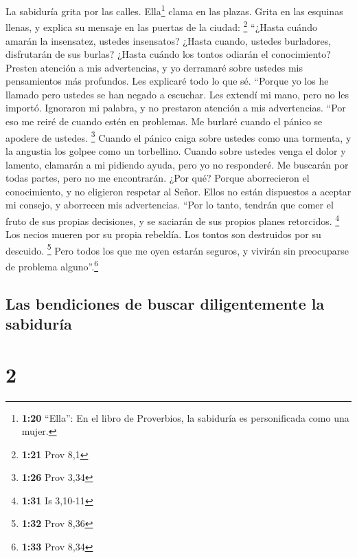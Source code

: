  La sabiduría grita por las calles. Ella\footnote{\textbf{1:20}
  ``Ella'': En el libro de Proverbios, la sabiduría es personificada
  como una mujer.} clama en las plazas.  Grita en las
esquinas llenas, y explica su mensaje en las puertas de la ciudad:
\footnote{\textbf{1:21} Prov 8,1}  ``¿Hasta cuándo amarán
la insensatez, ustedes insensatos? ¿Hasta cuando, ustedes burladores,
disfrutarán de sus burlas? ¿Hasta cuándo los tontos odiarán el
conocimiento?  Presten atención a mis advertencias, y yo
derramaré sobre ustedes mis pensamientos más profundos. Les explicaré
todo lo que sé.  ``Porque yo los he llamado pero ustedes
se han negado a escuchar. Les extendí mi mano, pero no les importó.
 Ignoraron mi palabra, y no prestaron atención a mis
advertencias.  ``Por eso me reiré de cuando estén en
problemas. Me burlaré cuando el pánico se apodere de ustedes.
\footnote{\textbf{1:26} Prov 3,34}  Cuando el pánico
caiga sobre ustedes como una tormenta, y la angustia los golpee como un
torbellino. Cuando sobre ustedes venga el dolor y lamento,
 clamarán a mi pidiendo ayuda, pero yo no responderé. Me
buscarán por todas partes, pero no me encontrarán.  ¿Por
qué? Porque aborrecieron el conocimiento, y no eligieron respetar al
Señor.  Ellos no están dispuestos a aceptar mi consejo, y
aborrecen mis advertencias.  ``Por lo tanto, tendrán que
comer el fruto de sus propias decisiones, y se saciarán de sus propios
planes retorcidos. \footnote{\textbf{1:31} Is 3,10-11} 
Los necios mueren por su propia rebeldía. Los tontos son destruidos por
su descuido. \footnote{\textbf{1:32} Prov 8,36}  Pero
todos los que me oyen estarán seguros, y vivirán sin preocuparse de
problema alguno''.\footnote{\textbf{1:33} Prov 8,34}

\hypertarget{las-bendiciones-de-buscar-diligentemente-la-sabiduruxeda}{%
\subsection{Las bendiciones de buscar diligentemente la
sabiduría}\label{las-bendiciones-de-buscar-diligentemente-la-sabiduruxeda}}

\hypertarget{section-1}{%
\section{2}\label{section-1}}

